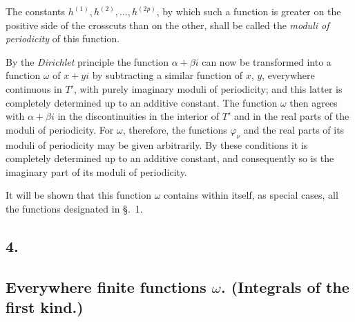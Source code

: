 \documentclass{article}
\begin{document}
The constants $h^{(1)}, h^{(2)}, \ldots, h^{(2p)}$, by which such a function is greater on the positive side of the crosscuts than on the other, shall be called the \emph{moduli of periodicity} of this function.

By the \emph{Dirichlet} principle the function $\alpha + \beta i$ can now be transformed into a function $\omega$ of $x + yi$ by subtracting a similar function of $x$, $y$, everywhere continuous in $T'$, with purely imaginary moduli of periodicity; and this latter is completely determined up to an additive constant. The function $\omega$ then agrees with $\alpha + \beta i$ in the discontinuities in the interior of $T'$ and in the real parts of the moduli of periodicity. For $\omega$, therefore, the functions $\varphi_{\nu}$ and the real parts of its moduli of periodicity may be given arbitrarily. By these conditions it is completely determined up to an additive constant, and consequently so is the imaginary part of its moduli of periodicity.

It will be shown that this function $\omega$ contains within itself, as special cases, all the functions designated in §.~1.

\subsection*{4.}

\subsection*{Everywhere finite functions $\omega$. (Integrals of the first kind.)}
\end{document}
